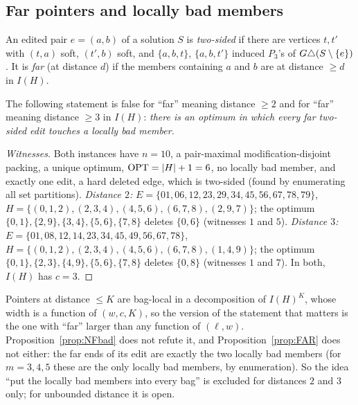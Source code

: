 \subsection{Far pointers and locally bad members}
An edited pair $e=(a,b)$ of a solution $S$ is \emph{two-sided} if there are vertices $t,t'$ with $(t,a)$ soft, $(t',b)$ soft, and $\{a,b,t\}$, $\{a,b,t'\}$ induced $P_3$'s of $G\triangle(S\setminus\{e\})$. It is \emph{far} (at distance $d$) if the members containing $a$ and $b$ are at distance $\ge d$ in $I(H)$.
\begin{proposition}\label{prop:NFbad}
The following statement is false for ``far'' meaning distance $\ge2$ and for ``far'' meaning distance $\ge3$ in $I(H)$: \emph{there is an optimum in which every far two-sided edit touches a locally bad member.}
\end{proposition}
\begin{proof}[Witnesses]
Both instances have $n=10$, a pair-maximal modification-disjoint packing, a unique optimum, $\mathrm{OPT}=|H|+1=6$, no locally bad member, and exactly one edit, a hard deleted edge, which is two-sided (found by enumerating all set partitions).
\emph{Distance $2$:} $E=\{01,\allowbreak 06,\allowbreak 12,\allowbreak 23,\allowbreak 29,\allowbreak 34,\allowbreak 45,\allowbreak 56,\allowbreak 67,\allowbreak 78,\allowbreak 79\}$, $H=\{(0,1,2),(2,3,4),(4,5,6),(6,7,8),(2,9,7)\}$; the optimum $\{0,1\},\{2,9\},\{3,4\},\{5,6\},\{7,8\}$ deletes $\{0,6\}$ (witnesses $1$ and $5$).
\emph{Distance $3$:} $E=\{01,\allowbreak 08,\allowbreak 12,\allowbreak 14,\allowbreak 23,\allowbreak 34,\allowbreak 45,\allowbreak 49,\allowbreak 56,\allowbreak 67,\allowbreak 78\}$, $H=\{(0,1,2),(2,3,4),(4,5,6),(6,7,8),(1,4,9)\}$; the optimum $\{0,1\},\{2,3\},\{4,9\},\{5,6\},\{7,8\}$ deletes $\{0,8\}$ (witnesses $1$ and $7$). In both, $I(H)$ has $c=3$.
\end{proof}
\begin{remark}[Scope]\label{rem:NFscope}
Pointers at distance $\le K$ are bag-local in a decomposition of $I(H)^K$, whose width is a function of $(w,c,K)$, so the version of the statement that matters is the one with ``far'' larger than any function of $(\ell,w)$. Proposition~\ref{prop:NFbad} does not refute it, and Proposition~\ref{prop:FAR} does not either: the far ends of its edit are exactly the two locally bad members (for $m=3,4,5$ these are the only locally bad members, by enumeration). So the idea ``put the locally bad members into every bag'' is excluded for distances $2$ and $3$ only; for unbounded distance it is open.
\end{remark}

